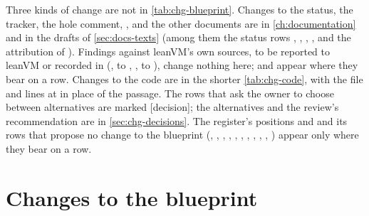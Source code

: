 \begin{sloppypar}Three kinds of change are not in \cref{tab:chg-blueprint}. Changes to the status, the tracker, the
hole comment, ,  and the other documents
are in \cref{ch:documentation} and in the drafts of \cref{sec:docs-texts} (among them the status
rows , , , ,  and the attribution of
). Findings against leanVM's own sources, to be reported to leanVM or recorded in
 (,  to , ,  to
), change nothing here;  and  appear where they bear on a row. Changes to the code are in the shorter
\cref{tab:chg-code}, with the file and lines at  in place of the passage. The rows
that ask the owner to choose between alternatives are marked \textsf{[decision]}; the alternatives
and the review's recommendation are in \cref{sec:chg-decisions}. The register's positions 
and  and its rows that propose no change to the blueprint (, ,
, , , , , , ,
, ) appear only where they bear on a row.\end{sloppypar}

\section{Changes to the blueprint}\label{sec:chg-blueprint}

